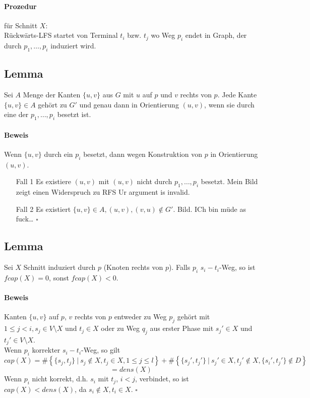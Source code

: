 \documentclass{article}
\newcommand{\set}[2]{\left\lbrace #1~|~#2 \right\rbrace}
\newcommand{\qed}{$\square$}
\begin{document}
\paragraph{Prozedur} für Schnitt $X$:\\
Rückwärts-\textsc{LFS} startet von Terminal $t_i$ bzw. $t_j$ wo Weg $p_i$ endet in Graph, der durch $p_1,\ldots, p_i$ induziert wird.

\subsection{Lemma}
Sei $A$ Menge der Kanten $\{u,v\}$ aus $G$ mit $u$ auf $p$ und $v$ rechts von $p$. Jede Kante $\{u,v\} \in A$ gehört zu $G'$ und genau dann in Orientierung $(u,v)$, wenn sie durch eine der $p_1, \ldots, p_i$ besetzt ist.

\paragraph{Beweis}
Wenn $\{u,v\}$ durch ein $p_i$ besetzt, dann wegen Konstruktion von $p$ in Orientierung $(u,v)$.
\begin{enumerate}
	\item[Fall 1] Es existiere $(u,v)$ mit $(u,v)$ nicht durch $p_1, \ldots, p_i$ besetzt. Mein Bild zeigt einen Widerspruch zu RFS Ur argument is invalid.
	\item[Fall 2] Es existiert $\{u,v\} \in A, (u,v), (v,u) \notin G'$. Bild. ICh bin müde as fuck\ldots
	\qed
\end{enumerate}

\subsection{Lemma}
Sei $X$ Schnitt induziert durch $p$ (Knoten rechts von $p$). Falls $p_i$ $s_i-t_i$-Weg, so ist $fcap(X) = 0$, sonst $fcap(X) < 0$.
\paragraph{Beweis}
Kanten $\{u,v\}$ auf $p$, $v$ rechts von $p$ entweder zu Weg $p_j$ gehört mit $1 \leq j < i, s_j \in V\setminus X$ und $t_j\in X$ oder zu Weg $q_j$ aus erster Phase mit $s_j'\in X$ und $t_j' \in V\setminus X$.\\
Wenn $p_i$ korrekter $s_i-t_i$-Weg, so gilt
\[cap(X) = \# \set{\{s_j, t_j\}}{s_j \notin X, t_j \in X, 1 \leq j \leq l}
+\# \set{\{s_j', t_j'\}}{s_j' \in X, t_j' \notin X, \{s_i', t_j'\} \notin D } \]
\[ = dens(X)\]
Wenn $p_i$ nicht korrekt, d.h. $s_i$ mit $t_j$, $i< j$, verbindet, so ist $cap(X) < dens(X)$, da $s_i \notin X, t_i \in X$.
\qed
\end{document}
